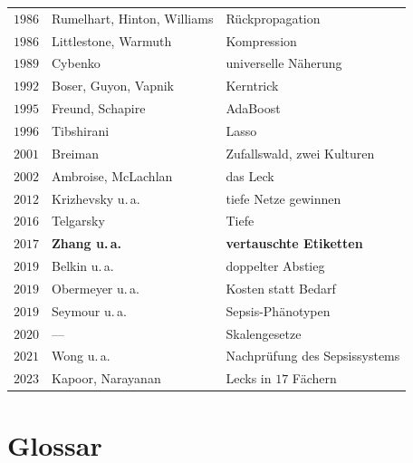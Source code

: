 \begin{merksatz}
\begin{center}
{\begin{tabular}{@{}P{1.3cm}P{3.0cm}P{4.0cm}@{}}
$1986$ & Rumelhart, Hinton, Williams & Rückpropagation\\
$1986$ & Littlestone, Warmuth & Kompression\\
$1989$ & Cybenko & universelle Näherung\\
$1992$ & Boser, Guyon, Vapnik & Kerntrick\\
$1995$ & Freund, Schapire & AdaBoost\\
$1996$ & Tibshirani & Lasso\\
$2001$ & Breiman & Zufallswald, zwei Kulturen\\
$2002$ & Ambroise, McLachlan & das Leck\\
$2012$ & Krizhevsky u.\,a. & tiefe Netze gewinnen\\
$2016$ & Telgarsky & Tiefe\\
$2017$ & \textbf{Zhang u.\,a.} & \textbf{vertauschte Etiketten}\\
$2019$ & Belkin u.\,a. & doppelter Abstieg\\
$2019$ & Obermeyer u.\,a. & Kosten statt Bedarf\\
$2019$ & Seymour u.\,a. & Sepsis-Phänotypen\\
$2020$ & --- & Skalengesetze\\
$2021$ & Wong u.\,a. & Nachprüfung des Sepsissystems\\
$2023$ & Kapoor, Narayanan & Lecks in $17$ Fächern\\
\bottomrule
\end{tabular}}
\end{center}
\end{merksatz}

\section{Glossar}

